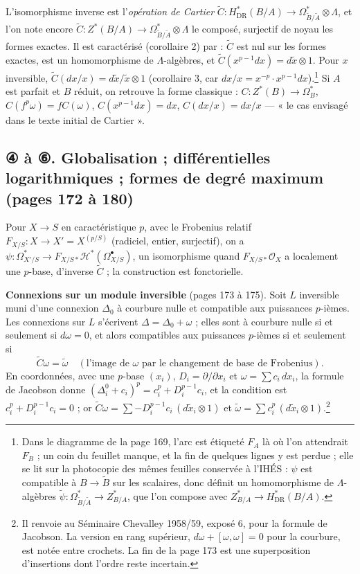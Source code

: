 \documentclass[11pt,a4paper]{article}
\begin{document}
L'isomorphisme inverse est l'\emph{opération de Cartier}
$\widetilde C : H^*_{\mathrm{DR}}(B/A) \to \Omega^*_{\widetilde B/\widetilde A}
\otimes \Lambda$, et l'on note encore $\widetilde C : Z^*(B/A) \to
\Omega^*_{\widetilde B/\widetilde A}\otimes\Lambda$ le composé, surjectif de noyau
les formes exactes. Il est caractérisé (corollaire 2) par : $\widetilde C$ est
nul sur les formes exactes, est un homomorphisme de $\Lambda$-algèbres, et
$\widetilde C(x^{p-1}dx) = d\tilde x \otimes 1$. Pour $x$ inversible,
$\widetilde C(dx/x) = d\tilde x/\tilde x \otimes 1$ (corollaire 3, car $dx/x =
x^{-p}\cdot x^{p-1}dx$).\footnote{Dans le diagramme de la page 169, l'arc est
étiqueté $F_A$ là où l'on attendrait $F_B$ ; un coin du feuillet manque, et
la fin de quelques lignes y est perdue ; elle se lit sur la photocopie des
mêmes feuilles conservée à l'IHÉS : $\psi$ est compatible à $B \to \widetilde B$
sur les scalaires, donc définit un homomorphisme de $\Lambda$-algèbres
$\widetilde\psi : \Omega^*_{\widetilde B/\widetilde A} \to Z^*_{B/A}$, que l'on
compose avec $Z^*_{B/A} \to H^*_{\mathrm{DR}}(B/A)$.} Si $A$ est parfait et $B$ réduit, on
retrouve la forme classique : $C : Z^*(B) \to \Omega^*_B$,
$C(f^p\omega) = fC(\omega)$, $C(x^{p-1}dx) = dx$, $C(dx/x) = dx/x$ — « le cas
envisagé dans le texte initial de Cartier ».

\subsection*{④ à ⑥. Globalisation ; différentielles logarithmiques ; formes de degré maximum (pages 172 à 180)}

Pour $X \to S$ en caractéristique $p$, avec le Frobenius relatif
$F_{X/S} : X \to X' = X^{(p/S)}$ (radiciel, entier, surjectif), on a
$\psi : \Omega^*_{X'/S} \to F_{X/S*}\mathcal{H}^*(\Omega^\bullet_{X/S})$, un
isomorphisme quand $F_{X/S*}\mathcal{O}_X$ a localement une $p$-base, d'inverse
$\widetilde C$ ; la construction est fonctorielle.

\textbf{Connexions sur un module inversible} (pages 173 à 175). Soit $L$
inversible muni d'une connexion $\Delta_0$ à courbure nulle et compatible aux
puissances $p$-ièmes. Les connexions sur $L$ s'écrivent $\Delta = \Delta_0 +
\omega$ ; elles sont à courbure nulle si et seulement si $d\omega = 0$, et alors
compatibles aux puissances $p$-ièmes si et seulement si
\[
  \widetilde C\omega = \tilde\omega \quad (\text{l'image de } \omega \text{ par le
  changement de base de Frobenius}).
\]
En coordonnées, avec une $p$-base $(x_i)$, $D_i = \partial/\partial x_i$ et
$\omega = \sum c_i\,dx_i$, la formule de Jacobson donne $(\Delta^0_i + c_i)^p =
c_i^p + D_i^{p-1}c_i$, et la condition est $c_i^p + D_i^{p-1}c_i = 0$ ; or
$\widetilde C\omega = \sum -D_i^{p-1}c_i\,(d\tilde x_i \otimes 1)$ et
$\tilde\omega = \sum c_i^p\,(d\tilde x_i \otimes 1)$.\footnote{Il renvoie au
Séminaire Chevalley 1958/59, exposé 6, pour la formule de Jacobson. La
version en rang supérieur, $d\omega + [\omega,\omega] = 0$ pour la courbure,
est notée entre crochets. La fin de la page 173 est une superposition
d'insertions dont l'ordre reste incertain.}
\end{document}
